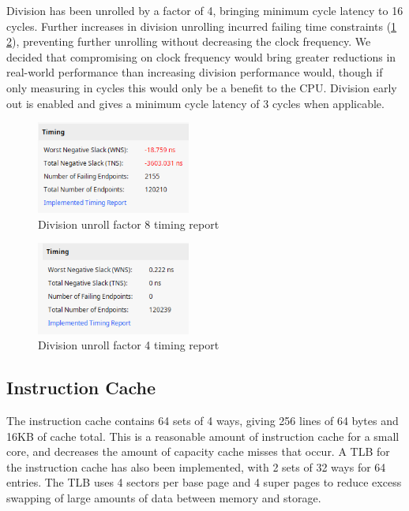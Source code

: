 Division has been unrolled by a factor of 4, bringing minimum cycle latency to 16 cycles. Further increases in division unrolling incurred failing time constraints (\ref{fig:8div_timing} \ref{fig:4div_timing}), preventing further unrolling without decreasing the clock frequency. We decided that compromising on clock frequency would bring greater reductions in real-world performance than increasing division performance would, though if only measuring in cycles this would only be a benefit to the CPU. Division early out is enabled and gives a minimum cycle latency of 3 cycles when applicable.

\begin{figure}[h!]
    \centering
    \includegraphics[width=0.45\textwidth]{img/8div_timing.png}
    \caption{Division unroll factor 8 timing report}
    \label{fig:8div_timing}
\end{figure}

\begin{figure}[h!]
    \centering
    \includegraphics[width=0.45\textwidth]{img/4div_timing.png}
    \caption{Division unroll factor 4 timing report}
    \label{fig:4div_timing}
\end{figure}

\subsection{Instruction Cache}
The instruction cache contains 64 sets of 4 ways, giving 256 lines of 64 bytes and 16KB of cache total. This is a reasonable amount of instruction cache for a small core, and decreases the amount of capacity cache misses that occur. A TLB for the instruction cache has also been implemented, with 2 sets of 32 ways for 64 entries. The TLB uses 4 sectors per base page and 4 super pages to reduce excess swapping of large amounts of data between memory and storage.

